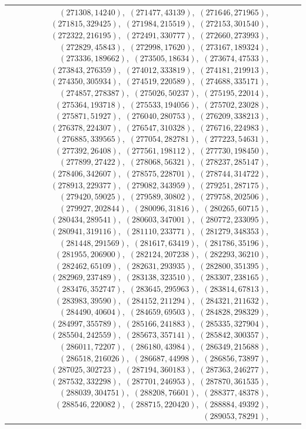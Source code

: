 \documentclass[11pt]{article}
\begin{document}
\begin{longtable}{@{}rrl>{\raggedright\arraybackslash}p{}@{}}
$(271308,14240)$,\allowbreak\ $(271477,43139)$,\allowbreak\ $(271646,271965)$,\allowbreak\ $(271815,329425)$,\allowbreak\ $(271984,215519)$,\allowbreak\ $(272153,301540)$,\allowbreak\ $(272322,216195)$,\allowbreak\ $(272491,330777)$,\allowbreak\ $(272660,273993)$,\allowbreak\ $(272829,45843)$,\allowbreak\ $(272998,17620)$,\allowbreak\ $(273167,189324)$,\allowbreak\ $(273336,189662)$,\allowbreak\ $(273505,18634)$,\allowbreak\ $(273674,47533)$,\allowbreak\ $(273843,276359)$,\allowbreak\ $(274012,333819)$,\allowbreak\ $(274181,219913)$,\allowbreak\ $(274350,305934)$,\allowbreak\ $(274519,220589)$,\allowbreak\ $(274688,335171)$,\allowbreak\ $(274857,278387)$,\allowbreak\ $(275026,50237)$,\allowbreak\ $(275195,22014)$,\allowbreak\ $(275364,193718)$,\allowbreak\ $(275533,194056)$,\allowbreak\ $(275702,23028)$,\allowbreak\ $(275871,51927)$,\allowbreak\ $(276040,280753)$,\allowbreak\ $(276209,338213)$,\allowbreak\ $(276378,224307)$,\allowbreak\ $(276547,310328)$,\allowbreak\ $(276716,224983)$,\allowbreak\ $(276885,339565)$,\allowbreak\ $(277054,282781)$,\allowbreak\ $(277223,54631)$,\allowbreak\ $(277392,26408)$,\allowbreak\ $(277561,198112)$,\allowbreak\ $(277730,198450)$,\allowbreak\ $(277899,27422)$,\allowbreak\ $(278068,56321)$,\allowbreak\ $(278237,285147)$,\allowbreak\ $(278406,342607)$,\allowbreak\ $(278575,228701)$,\allowbreak\ $(278744,314722)$,\allowbreak\ $(278913,229377)$,\allowbreak\ $(279082,343959)$,\allowbreak\ $(279251,287175)$,\allowbreak\ $(279420,59025)$,\allowbreak\ $(279589,30802)$,\allowbreak\ $(279758,202506)$,\allowbreak\ $(279927,202844)$,\allowbreak\ $(280096,31816)$,\allowbreak\ $(280265,60715)$,\allowbreak\ $(280434,289541)$,\allowbreak\ $(280603,347001)$,\allowbreak\ $(280772,233095)$,\allowbreak\ $(280941,319116)$,\allowbreak\ $(281110,233771)$,\allowbreak\ $(281279,348353)$,\allowbreak\ $(281448,291569)$,\allowbreak\ $(281617,63419)$,\allowbreak\ $(281786,35196)$,\allowbreak\ $(281955,206900)$,\allowbreak\ $(282124,207238)$,\allowbreak\ $(282293,36210)$,\allowbreak\ $(282462,65109)$,\allowbreak\ $(282631,293935)$,\allowbreak\ $(282800,351395)$,\allowbreak\ $(282969,237489)$,\allowbreak\ $(283138,323510)$,\allowbreak\ $(283307,238165)$,\allowbreak\ $(283476,352747)$,\allowbreak\ $(283645,295963)$,\allowbreak\ $(283814,67813)$,\allowbreak\ $(283983,39590)$,\allowbreak\ $(284152,211294)$,\allowbreak\ $(284321,211632)$,\allowbreak\ $(284490,40604)$,\allowbreak\ $(284659,69503)$,\allowbreak\ $(284828,298329)$,\allowbreak\ $(284997,355789)$,\allowbreak\ $(285166,241883)$,\allowbreak\ $(285335,327904)$,\allowbreak\ $(285504,242559)$,\allowbreak\ $(285673,357141)$,\allowbreak\ $(285842,300357)$,\allowbreak\ $(286011,72207)$,\allowbreak\ $(286180,43984)$,\allowbreak\ $(286349,215688)$,\allowbreak\ $(286518,216026)$,\allowbreak\ $(286687,44998)$,\allowbreak\ $(286856,73897)$,\allowbreak\ $(287025,302723)$,\allowbreak\ $(287194,360183)$,\allowbreak\ $(287363,246277)$,\allowbreak\ $(287532,332298)$,\allowbreak\ $(287701,246953)$,\allowbreak\ $(287870,361535)$,\allowbreak\ $(288039,304751)$,\allowbreak\ $(288208,76601)$,\allowbreak\ $(288377,48378)$,\allowbreak\ $(288546,220082)$,\allowbreak\ $(288715,220420)$,\allowbreak\ $(288884,49392)$,\allowbreak\ $(289053,78291)$,\allowbreak\ 
\end{longtable}
\end{document}
